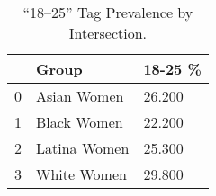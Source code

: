 \begin{table}[htbp]
\centering
\caption{“18–25” Tag Prevalence by Intersection.}
\label{tab:eda_age_tag_by_group}
\begin{tabular}{lll}
\toprule
 & Group & 18-25 \% \\
\midrule
0 & Asian Women & 26.200 \\
1 & Black Women & 22.200 \\
2 & Latina Women & 25.300 \\
3 & White Women & 29.800 \\
\bottomrule
\end{tabular}

\end{table}